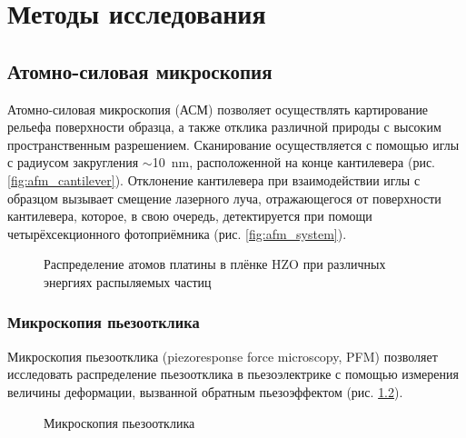\chapter{Методы исследования }\label{ch:ch2}

\section{Атомно-силовая микроскопия}\label{sec:ch2/sect1}
Атомно-силовая микроскопия (АСМ) позволяет осуществлять картирование рельефа поверхности образца, а также отклика различной природы с высоким пространственным разрешением. Сканирование осуществляется с помощью иглы с радиусом закругления \(\sim\)\SI{10}{\nm}, расположенной на конце кантилевера (рис. \cref{fig:afm_cantilever}). Отклонение кантилевера при взаимодействии иглы с образцом вызывает смещение лазерного луча, отражающегося от поверхности кантилевера, которое, в свою очередь, детектируется при помощи четырёхсекционного фотоприёмника (рис. \cref{fig:afm_system}).

\begin{figure}[ht]
    \caption[Этот текст попадает в названия рисунков в списке рисунков]{Распределение атомов платины в плёнке HZO  при различных энергиях распыляемых частиц}\label{fig:afm}
\end{figure}

\subsection{Микроскопия пьезоотклика}\label{sec:ch2/sect1/sub1}
Микроскопия пьезоотклика (piezoresponse force microscopy, PFM) позволяет исследовать распределение пьезоотклика в пьезоэлектрике с помощью измерения величины деформации, вызванной обратным пьезоэффектом (рис. \cref{fig:pfm}).

\begin{figure}[ht]
    \caption{Микроскопия пьезоотклика}\label{fig:pfm}
\end{figure}

